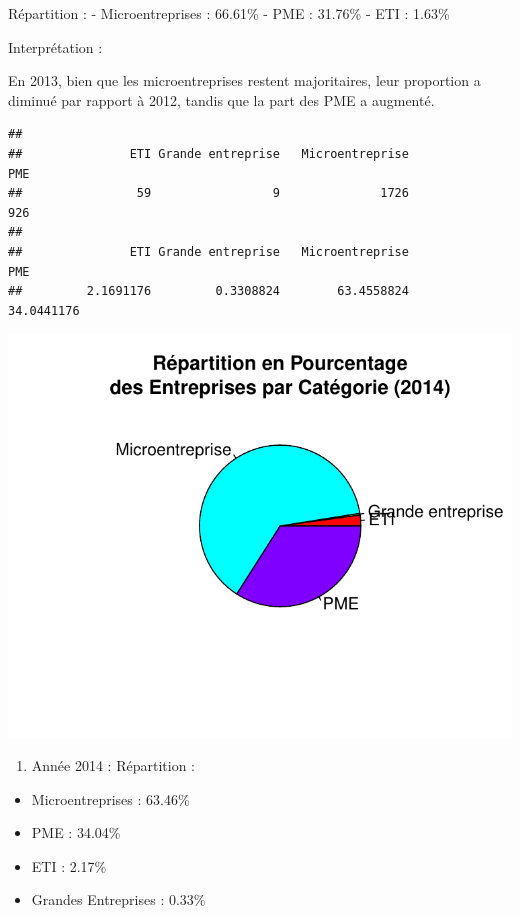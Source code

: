 \documentclass[mstat,12pt]{unswthesis}
\begin{document}
Répartition : - Microentreprises : 66.61\% - PME : 31.76\% - ETI :
1.63\%

Interprétation :

\medskip

En 2013, bien que les microentreprises restent majoritaires, leur
proportion a diminué par rapport à 2012, tandis que la part des PME a
augmenté.

\medskip

\begin{verbatim}
## 
##               ETI Grande entreprise   Microentreprise               PME 
##                59                 9              1726               926 
## 
##               ETI Grande entreprise   Microentreprise               PME 
##         2.1691176         0.3308824        63.4558824        34.0441176
\end{verbatim}

\includegraphics{TDDT_projet_L_2_files/figure-latex/analyse_univariee_2014-1.pdf}

\medskip

\begin{enumerate}
\def\labelenumi{\arabic{enumi})}
\setcounter{enumi}{2}
\tightlist
\item
  Année 2014 : Répartition :
\end{enumerate}

\begin{itemize}
\tightlist
\item
  Microentreprises : 63.46\%
\item
  PME : 34.04\%
\item
  ETI : 2.17\%
\item
  Grandes Entreprises : 0.33\%
\end{itemize}
\end{document}
